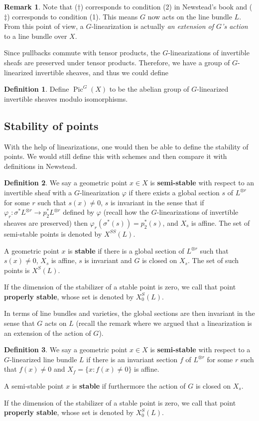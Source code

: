 \documentclass[12pt]{article}
\theoremstyle{remark}
\theoremstyle{definition}
\newtheorem{remark}{Remark}[section]
\newtheorem{definition}{Definition}[section]
\newcommand{\s}[0]{\sigma}
\newcommand{\Pic}[0]{\operatorname{Pic}}
\begin{document}
    \begin{remark}
    Note that ($\dagger$) corresponds to condition (2) in Newstead's book and ($\ddagger$) corresponds to condition (1). This means $G$ now acts on the line bundle $L$. From this point of view, a $G$-linearization is actually \textit{an extension of $G$'s action} to a line bundle over $X$.
    \end{remark}
    Since pullbacks commute with tensor products, the $G$-linearizations of invertible sheafs are preserved under tensor products. Therefore, we have a group of $G$-linearized invertible sheaves, and thus we could define
    \begin{definition}
        Define $\Pic^G(X)$ to be the abelian group of $G$-linearized invertible sheaves modulo isomorphisms.
    \end{definition}
    \subsection{Stability of points}
    With the help of linearizations, one would then be able to define the stability of points. We would still define this with schemes and then compare it with definitions in Newstead.
    \begin{definition}
        We say a geometric point $x\in X$ is \textbf{semi-stable} with respect to an invertible sheaf with a $G$-linearization $\varphi$ if there exists a global section $s$ of $L^{\otimes r}$ for some $r$ such that $s(x)\neq 0$, $s$ is invariant in the sense that if $\varphi_r:\s^*L^{\otimes r}\to p_2^*L^{\otimes r}$ defined by $\varphi$ (recall how the $G$-linearizations of invertible sheaves are preserved) then $\varphi_r(\s^*(s))=p_2^*(s)$, and $X_s$ is affine. The set of semi-stable points is denoted by $X^{SS}(L)$.

        A geometric point $x$ is \textbf{stable} if there is a global section of $L^{\otimes r}$ such that $s(x)\neq 0$, $X_s$ is affine, $s$ is invariant and $G$ is closed on $X_s$. The set of such points is $X^S(L)$.

        If the dimension of the stabilizer of a stable point is zero, we call that point \textbf{properly stable}, whose set is denoted by $X^S_0(L)$.
    \end{definition}
    In terms of line bundles and varieties, the global sections are then invariant in the sense that $G$ acts on $L$ (recall the remark where we argued that a linearization is an extension of the action of $G$).
    \begin{definition}
        We say a geometric point $x\in X$ is \textbf{semi-stable} with respect to a $G$-linearized line bundle $L$ if there is an invariant section $f$ of $L^{\otimes r}$ for some $r$ such that $f(x)\neq 0$ and $X_f=\{x:f(x)\neq 0\}$ is affine.

        A semi-stable point $x$ is \textbf{stable} if furthermore the action of $G$ is closed on $X_s$.

        If the dimension of the stabilizer of a stable point is zero, we call that point \textbf{properly stable}, whose set is denoted by $X^S_0(L)$.
    \end{definition}
\end{document}
